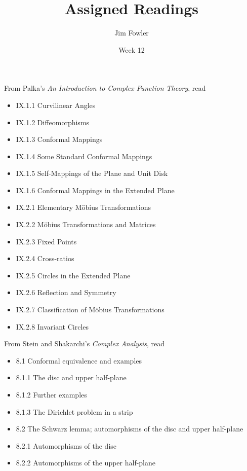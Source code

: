 \documentclass{homework}
\author{Jim Fowler}
\title{Assigned Readings}
\date{Week 12}
\begin{document}
\maketitle


From Palka's \textit{An Introduction to Complex Function Theory}, read
\begin{itemize}
\item IX.1.1 Curvilinear Angles
\item IX.1.2 Diffeomorphisms
\item IX.1.3 Conformal Mappings
\item IX.1.4 Some Standard Conformal Mappings
\item IX.1.5 Self-Mappings of the Plane and Unit Disk
\item IX.1.6 Conformal Mappings in the Extended Plane
\item IX.2.1 Elementary M\"obius Transformations
\item IX.2.2 M\"obius Transformations and Matrices
\item IX.2.3 Fixed Points
\item IX.2.4 Cross-ratios
\item IX.2.5 Circles in the Extended Plane
\item IX.2.6 Reflection and Symmetry
\item IX.2.7 Classification of M\"obius Transformations
\item IX.2.8 Invariant Circles
\end{itemize}

From Stein and Shakarchi's \textit{Complex Analysis}, read
\begin{itemize}
\item 8.1 Conformal equivalence and examples
\item 8.1.1 The disc and upper half-plane
\item 8.1.2 Further examples
\item 8.1.3 The Dirichlet problem in a strip
\item 8.2 The Schwarz lemma; automorphisms of the disc and upper half-plane
\item 8.2.1 Automorphisms of the disc
\item 8.2.2 Automorphisms of the upper half-plane
\end{itemize}
\end{document}
